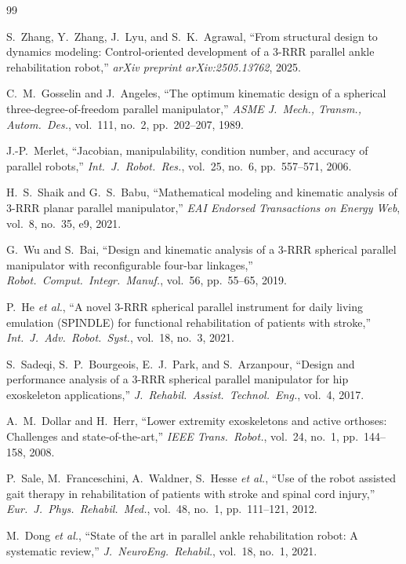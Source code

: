 \documentclass[conference]{IEEEtran}
\begin{document}
\begin{thebibliography}{99}

 S.~Zhang, Y.~Zhang, J.~Lyu, and S.~K.~Agrawal, ``From structural design to dynamics modeling: Control-oriented development of a 3-RRR parallel ankle rehabilitation robot,'' \emph{arXiv preprint arXiv:2505.13762}, 2025.

 C.~M.~Gosselin and J.~Angeles, ``The optimum kinematic design of a spherical three-degree-of-freedom parallel manipulator,'' \emph{ASME J.~Mech., Transm., Autom.~Des.}, vol.~111, no.~2, pp.~202--207, 1989.

 J.-P.~Merlet, ``Jacobian, manipulability, condition number, and accuracy of parallel robots,'' \emph{Int.~J.~Robot.~Res.}, vol.~25, no.~6, pp.~557--571, 2006.

 H.~S.~Shaik and G.~S.~Babu, ``Mathematical modeling and kinematic analysis of 3-RRR planar parallel manipulator,'' \emph{EAI Endorsed Transactions on Energy Web}, vol.~8, no.~35, e9, 2021.

 G.~Wu and S.~Bai, ``Design and kinematic analysis of a 3-RRR spherical parallel manipulator with reconfigurable four-bar linkages,'' \emph{Robot.~Comput.~Integr.~Manuf.}, vol.~56, pp.~55--65, 2019.

 P.~He \emph{et al.}, ``A novel 3-RRR spherical parallel instrument for daily living emulation (SPINDLE) for functional rehabilitation of patients with stroke,'' \emph{Int.~J.~Adv.~Robot.~Syst.}, vol.~18, no.~3, 2021.

 S.~Sadeqi, S.~P.~Bourgeois, E.~J.~Park, and S.~Arzanpour, ``Design and performance analysis of a 3-RRR spherical parallel manipulator for hip exoskeleton applications,'' \emph{J.~Rehabil.~Assist.~Technol.~Eng.}, vol.~4, 2017.

 A.~M.~Dollar and H.~Herr, ``Lower extremity exoskeletons and active orthoses: Challenges and state-of-the-art,'' \emph{IEEE Trans.~Robot.}, vol.~24, no.~1, pp.~144--158, 2008.

 P.~Sale, M.~Franceschini, A.~Waldner, S.~Hesse \emph{et al.}, ``Use of the robot assisted gait therapy in rehabilitation of patients with stroke and spinal cord injury,'' \emph{Eur.~J.~Phys.~Rehabil.~Med.}, vol.~48, no.~1, pp.~111--121, 2012.

 M.~Dong \emph{et al.}, ``State of the art in parallel ankle rehabilitation robot: A systematic review,'' \emph{J.~NeuroEng.~Rehabil.}, vol.~18, no.~1, 2021.


\end{thebibliography}
\end{document}
